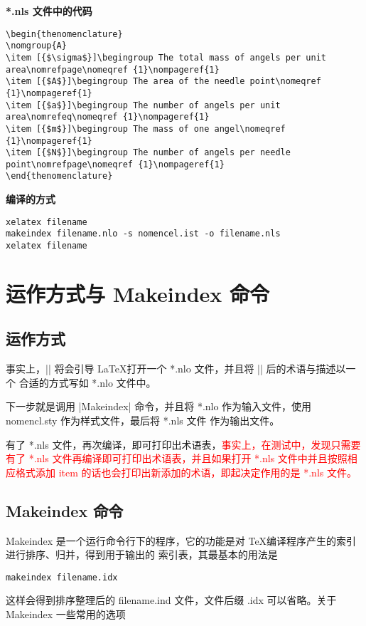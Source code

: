 \documentclass{ctexart}
\newcommand{\txr}[1]{\textcolor{red}{#1}}
\begin{document}
\noindent \textbf{*.nls 文件中的代码}
\begin{lstlisting}
\begin{thenomenclature} 
\nomgroup{A}
\item [{$\sigma$}]\begingroup The total mass of angels per unit area\nomrefpage\nomeqref {1}\nompageref{1}
\item [{$A$}]\begingroup The area of the needle point\nomeqref {1}\nompageref{1}
\item [{$a$}]\begingroup The number of angels per unit area\nomrefeq\nomeqref {1}\nompageref{1}
\item [{$m$}]\begingroup The mass of one angel\nomeqref {1}\nompageref{1}
\item [{$N$}]\begingroup The number of angels per needle point\nomrefpage\nomeqref {1}\nompageref{1}
\end{thenomenclature}
\end{lstlisting}

\noindent \textbf{编译的方式}
\begin{lstlisting}
xelatex filename
makeindex filename.nlo -s nomencel.ist -o filename.nls
xelatex filename
\end{lstlisting}

\section{运作方式与 Makeindex 命令}
\subsection{运作方式}
\par 
事实上，|\makenomenclature| 将会引导 \LaTeX 打开一个 *.nlo 文件，并且将 |\nomenclature| 后的术语与描述以一个  
合适的方式写如 *.nlo 文件中。
\par 
下一步就是调用 |Makeindex| 命令，并且将 *.nlo 作为输入文件，使用 nomencl.sty 作为样式文件，最后将 *.nls 文件
作为输出文件。
\par 
有了 *.nls 文件，再次编译，即可打印出术语表，\txr{事实上，在测试中，发现只需要有了 *.nls 
	文件再编译即可打印出术语表，并且如果打开 *.nls 文件中并且按照相应格式添加 item 
	的话也会打印出新添加的术语，即起决定作用的是 *.nls 文件。}

\subsection{Makeindex 命令}
\par
Makeindex 是一个运行命令行下的程序，它的功能是对 \TeX 编译程序产生的索引进行排序、归并，得到用于输出的
索引表，其最基本的用法是
\begin{lstlisting}
makeindex filename.idx
\end{lstlisting}
这样会得到排序整理后的 filename.ind 文件，文件后缀 .idx 可以省略。关于 Makeindex 一些常用的选项
\end{document}
